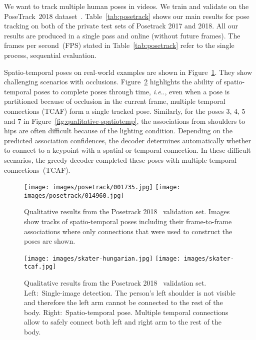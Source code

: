 \documentclass[journal]{IEEEtran}
\makeatletter
\DeclareRobustCommand\onedot{\futurelet\@let@token\@onedot}
\def\@onedot{\ifx\@let@token.\else.\null\fi\xspace}
\def\ie{\emph{i.e}\onedot} \def\Ie{\emph{I.e}\onedot}
\makeatother
\begin{document}
We want to track multiple human poses in videos. We train and validate
on the PoseTrack~2018 dataset~\cite{andriluka2018posetrack}.
Table~\ref{tab:posetrack} shows our main results for pose tracking
on both of the private test sets of Posetrack 2017 and 2018.
All our results are produced in a single pass and online (without future frames).
The frames per second~(FPS) stated in
Table~\ref{tab:posetrack} refer to the single process, sequential
evaluation.



Spatio-temporal poses on real-world examples are shown in
Figure~\ref{fig:qualitative}. They show challenging scenarios
with occlusions.
Figure~\ref{fig:qualitative-hungarian-vs-tcaf} highlights the ability of spatio-temporal poses to complete
poses through time, \ie, even when a pose is partitioned because of occlusion
in the current frame, multiple temporal connections (TCAF) form a single tracked pose.
Similarly, for the poses 3, 4, 5 and 7 in Figure~\ref{fig:qualitative-spatiotemp},
the
associations from shoulders to hips are often difficult because of the lighting
condition.
Depending on the predicted association confidences, the decoder determines
automatically whether to connect to a keypoint with a spatial or temporal
connection.
In these difficult scenarios, the greedy decoder
completed these poses with multiple temporal connections~(TCAF).


\begin{figure}
  \centering
\texttt{[image: images/posetrack/001735.jpg]}
\texttt{[image: images/posetrack/014960.jpg]}
  \caption{
    Qualitative results from the Posetrack 2018~\cite{andriluka2018posetrack}
    validation set.
Images show tracks of spatio-temporal poses including their frame-to-frame
    associations where only connections that
    were used to construct the poses are shown.
  }
  \label{fig:qualitative}
\end{figure}



\begin{figure}
  \centering
    \texttt{[image: images/skater-hungarian.jpg]}
    \texttt{[image: images/skater-tcaf.jpg]}
  \caption{
    Qualitative results from the Posetrack 2018~\cite{andriluka2018posetrack}
    validation set.
Left:~Single-image detection. The person's left shoulder is not visible and
    therefore the left arm cannot be connected to the rest of the body.
    Right:~Spatio-temporal pose. Multiple temporal connections allow to safely
    connect both left and right arm to the rest of the body.
  }
  \label{fig:qualitative-hungarian-vs-tcaf}
\end{figure}
\end{document}
